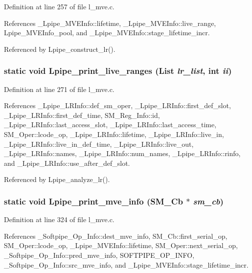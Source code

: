Definition at line 257 of file l\_\-mve.c.

References \_\-Lpipe\_\-MVEInfo::lifetime, \_\-Lpipe\_\-MVEInfo::live\_\-range, Lpipe\_\-MVEInfo\_\-pool, and \_\-Lpipe\_\-MVEInfo::stage\_\-lifetime\_\-incr.

Referenced by Lpipe\_\-construct\_\-lr().
\subsubsection{\setlength{\rightskip}{0pt plus 5cm}static void Lpipe\_\-print\_\-live\_\-ranges (List {\em lr\_\-list}, int {\em ii})\hspace{0.3cm}{\tt  [static]}}\label{l__mve_8c_6351038c17aadb5b3409428a8d2fd12b}




Definition at line 271 of file l\_\-mve.c.

References \_\-Lpipe\_\-LRInfo::def\_\-sm\_\-oper, \_\-Lpipe\_\-LRInfo::first\_\-def\_\-slot, \_\-Lpipe\_\-LRInfo::first\_\-def\_\-time, SM\_\-Reg\_\-Info::id, \_\-Lpipe\_\-LRInfo::last\_\-access\_\-slot, \_\-Lpipe\_\-LRInfo::last\_\-access\_\-time, SM\_\-Oper::lcode\_\-op, \_\-Lpipe\_\-LRInfo::lifetime, \_\-Lpipe\_\-LRInfo::live\_\-in, \_\-Lpipe\_\-LRInfo::live\_\-in\_\-def\_\-time, \_\-Lpipe\_\-LRInfo::live\_\-out, \_\-Lpipe\_\-LRInfo::names, \_\-Lpipe\_\-LRInfo::num\_\-names, \_\-Lpipe\_\-LRInfo::rinfo, and \_\-Lpipe\_\-LRInfo::use\_\-after\_\-def\_\-slot.

Referenced by Lpipe\_\-analyze\_\-lr().
\subsubsection{\setlength{\rightskip}{0pt plus 5cm}static void Lpipe\_\-print\_\-mve\_\-info (\bf{SM\_\-Cb} $\ast$ {\em sm\_\-cb})\hspace{0.3cm}{\tt  [static]}}\label{l__mve_8c_072448416103b6792781cb20ec102be1}




Definition at line 324 of file l\_\-mve.c.

References \_\-Softpipe\_\-Op\_\-Info::dest\_\-mve\_\-info, SM\_\-Cb::first\_\-serial\_\-op, SM\_\-Oper::lcode\_\-op, \_\-Lpipe\_\-MVEInfo::lifetime, SM\_\-Oper::next\_\-serial\_\-op, \_\-Softpipe\_\-Op\_\-Info::pred\_\-mve\_\-info, SOFTPIPE\_\-OP\_\-INFO, \_\-Softpipe\_\-Op\_\-Info::src\_\-mve\_\-info, and \_\-Lpipe\_\-MVEInfo::stage\_\-lifetime\_\-incr.

